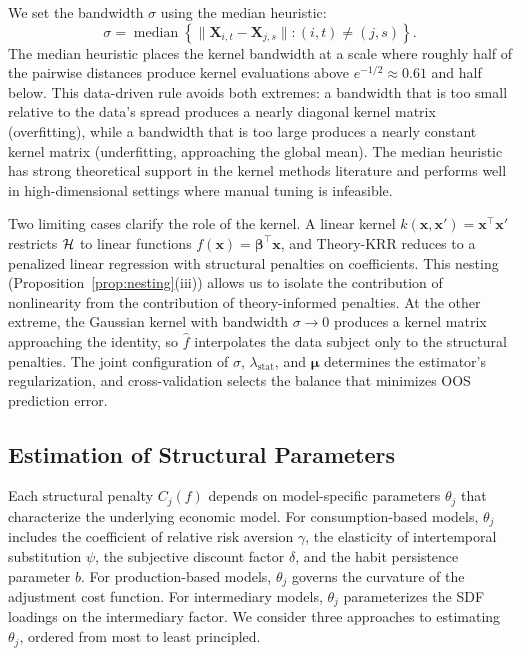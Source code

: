 We set the bandwidth $\sigma$ using the median heuristic:
\begin{equation}\label{eq:median_heuristic}
\sigma = \operatorname{median}\!\left\{\|\mathbf{X}_{i,t} - \mathbf{X}_{j,s}\| : (i,t) \neq (j,s)\right\}.
\end{equation}
The median heuristic places the kernel bandwidth at a scale where roughly half of the pairwise distances produce kernel evaluations above $e^{-1/2} \approx 0.61$ and half below.
This data-driven rule avoids both extremes: a bandwidth that is too small relative to the data's spread produces a nearly diagonal kernel matrix (overfitting), while a bandwidth that is too large produces a nearly constant kernel matrix (underfitting, approaching the global mean).
The median heuristic has strong theoretical support in the kernel methods literature and performs well in high-dimensional settings where manual tuning is infeasible.

Two limiting cases clarify the role of the kernel.
A linear kernel $k(\mathbf{x}, \mathbf{x}') = \mathbf{x}^\top \mathbf{x}'$ restricts $\mathcal{H}$ to linear functions $f(\mathbf{x}) = \bm{\beta}^\top \mathbf{x}$, and Theory-KRR reduces to a penalized linear regression with structural penalties on coefficients.
This nesting (Proposition~\ref{prop:nesting}(iii)) allows us to isolate the contribution of nonlinearity from the contribution of theory-informed penalties.
At the other extreme, the Gaussian kernel with bandwidth $\sigma \to 0$ produces a kernel matrix approaching the identity, so $\hat{f}$ interpolates the data subject only to the structural penalties.
The joint configuration of $\sigma$, $\lambda_{\mathrm{stat}}$, and $\bm{\mu}$ determines the estimator's regularization, and cross-validation selects the balance that minimizes OOS prediction error.

\subsection{Estimation of Structural Parameters}\label{sub:pre_estimation}

Each structural penalty $C_j(f)$ depends on model-specific parameters $\theta_j$ that characterize the underlying economic model.
For consumption-based models, $\theta_j$ includes the coefficient of relative risk aversion $\gamma$, the elasticity of intertemporal substitution $\psi$, the subjective discount factor $\delta$, and the habit persistence parameter $b$.
For production-based models, $\theta_j$ governs the curvature of the adjustment cost function.
For intermediary models, $\theta_j$ parameterizes the SDF loadings on the intermediary factor.
We consider three approaches to estimating $\theta_j$, ordered from most to least principled.

